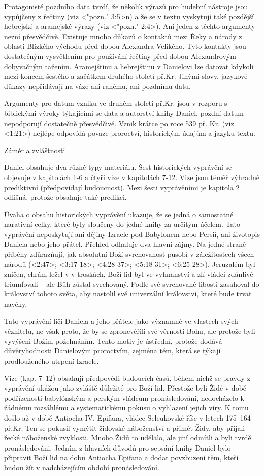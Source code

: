 Protagonisté  pozdního data  tvrdí, že několik  výrazů pro hudební nástroje jsou vypůjčeny z řečtiny (viz
<"pozn."  3:5>n) a že se v textu vyskytují také pozdější hebrejské a aramejské výrazy (viz <"pozn."  2:4>). Ani jeden z těchto
argumenty nezní přesvědčivě.
Existuje mnoho důkazů o kontaktů mezi Řeky a národy z oblasti Blízkého východu před dobou Alexandra Velikého.
Tyto kontakty jsou dostatečným vysvětlením pro používání řečtiny před dobou Alexandrovým dobyvačným tažením.
Aramejštinu a hebrejštinu v Danielovi lze datovat kdykoli mezi koncem šestého a začátkem druhého století př.Kr.
Jinými slovy, jazykové důkazy nepřidávají na váze ani ranému, ani pozdnímu datu.

Argumenty pro datum vzniku ve druhém století př.Kr. jsou v rozporu s biblickými výroky týkajícími se data
a autorství knihy Daniel, pozdní datum nepodporují dostatečně přesvědčivě.
Vznik krátce po roce 539 př. Kr. (viz <1:21>) nejlépe odpovídá povaze proroctví, historickým údajům a jazyku textu.

Záměr a zvláštnosti

Daniel obsahuje dva různé typy materiálu. Šest historických vyprávění se objevuje v kapitolách 1-6 a čtyři
vize v kapitolách 7-12.
Vize jsou téměř výhradně prediktivní (předpovídají budoucnost).
Mezi šesti vyprávěními je kapitola 2 odlišná, protože obsahuje také predikci.

Úvaha o obsahu historických vyprávění ukazuje, že se jedná o samostatné narativní celky,
které byly sloučeny do jedné knihy za určitým účelem.
Tato vyprávění neposkytují ani dějiny Izraele pod Babylonem nebo Persií, ani životopis Daniela nebo jeho přátel.
Přehled odhaluje dva hlavní zájmy.
Na jedné straně příběhy zdůrazňují, jak absolutní Boží svrchovanost působí v záležitostech
všech národů (<2:47>; <3:17-18>; <4:28-37>; <5:18-31>; <6:25-28>).
Jeruzalém byl zničen, chrám ležel v v troskách, Boží lid byl ve vyhnanství a zlí vládci zdánlivě triumfovali -- ale Bůh zůstal svrchovaný.
Podle své svrchované libosti zasahoval do království tohoto světa, aby nastolil své
univerzální království, které bude trvat navěky.

Tato vyprávění líčí Daniela a jeho přátele jako významné ve vlastech svých věznitelů, ne však
proto, že by se zpronevěřili své věrnosti Bohu, ale protože byli vyvýšeni Božím požehnáním.
Tento motiv je ústřední, protože dodává důvěryhodnosti Danielovým proroctvím, zejména těm, která se týkají
prodlouženého utrpení Izraele.

 Vize (kap. 7--12) obsahují předpovědi budoucích časů, během nichž se pravdy z vyprávění ukážou jako zvláště důležité pro Boží lid.
 Přestože byli Židé v době  podřízenosti babylónským a perským vládcům pronásledováni, 
nedocházelo k žádnému rozsáhlému a systematickému pokusu o vyhlazení jejich víry.
K tomu došlo až v době Antiocha IV. Epifana, vládce Seleukovské říše v letech 175--164 př.Kr.
Ten se pokusil vymýtit židovské náboženství a přimět Židy, aby  přijali řecké náboženské zvyklosti.
Mnoho Židů to udělalo, ale jiní odmítli a byli tvrdě pronásledováni.
Jedním z hlavních důvodů pro sepsání knihy Daniel bylo připravit Boží lid na dobu Antiocha Epifana a dodat povzbuzení těm, kteří  budou žít
v nadcházejícím období pronásledování.

